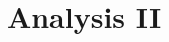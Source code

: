 \documentclass[landscape]{article}
\title{Analysis II}
\begin{document}
\footnotesize

\begin{multicols}{2}




\end{multicols}
\end{document}
